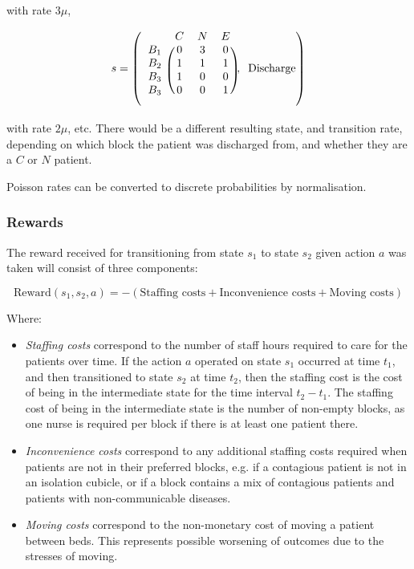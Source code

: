 \documentclass{article}
\begin{document}
with rate $3\mu$,

\begin{equation*}
s = \left(
\begin{blockarray}{cccc}
& C & N & E \\
\begin{block}{c(ccc)}
B_1 & 0 & 3 & 0 \\
B_2 & 1 & 1 & 1 \\
B_3 & 1 & 0 & 0 \\
B_3 & 0 & 0 & 1 \\
\end{block}
\end{blockarray}, \;\; \text{Discharge} \right)
\end{equation*}

with rate $2\mu$, etc. There would be a different resulting state, and transition rate, depending on which block the patient was discharged from, and whether they are a $C$ or $N$ patient.

Poisson rates can be converted to discrete probabilities by normalisation.


\subsubsection*{Rewards}

The reward received for transitioning from state $s_1$ to state $s_2$ given action $a$ was taken will consist of three components:

\begin{equation*}
\text{Reward}(s_1, s_2, a) = - (\text{Staffing costs} + \text{Inconvenience costs} + \text{Moving costs}) 
\end{equation*}

Where:

\begin{itemize}
  \item \textit{Staffing costs} correspond to the number of staff hours required to care for the patients over time.
  If the action $a$ operated on state $s_1$ occurred at time $t_1$, and then transitioned to state $s_2$ at time $t_2$, then the staffing cost is the cost of being in the intermediate state for the time interval $t_2 - t_1$.
  The staffing cost of being in the intermediate state is the number of non-empty blocks, as one nurse is required per block if there is at least one patient there.

  \item \textit{Inconvenience costs} correspond to any additional staffing costs required when patients are not in their preferred blocks, e.g. if a contagious patient is not in an isolation cubicle, or if a block contains a mix of contagious patients and patients with non-communicable diseases.

  \item \textit{Moving costs} correspond to the non-monetary cost of moving a patient between beds.
  This represents possible worsening of outcomes due to the stresses of moving.
\end{itemize}
\end{document}
